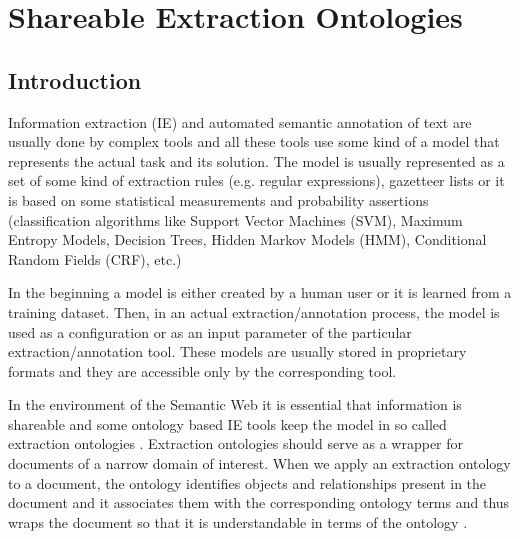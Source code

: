 \chapter{Shareable Extraction Ontologies} \label{ch:Shareable_Extraction_Ontologies}

\graphicspath{{../img/ch70/}}



\section{Introduction}


Information extraction (IE) and automated semantic annotation of text are usually done by complex tools and all these tools use some kind of a model that represents the actual task and its solution. The model is usually represented as a set of some kind of extraction rules (e.g. regular expressions), gazetteer lists or it is based on some statistical measurements and probability assertions (classification algorithms like Support Vector Machines (SVM), Maximum Entropy Models, Decision Trees, Hidden Markov Models (HMM), Conditional Random Fields (CRF), etc.)

In the beginning a model is either created by a human user or it is learned from a training dataset. Then, in an actual extraction/annotation process, the model is used as a configuration or as an input parameter of the particular extraction/annotation tool. These models are usually stored in proprietary formats and they are accessible only by the corresponding tool.

In the environment of the Semantic Web it is essential that information is shareable and some ontology based IE tools keep the model in so called extraction ontologies \citep{DBLP:conf/er/EmbleyTL02}. Extraction ontologies should serve as a wrapper for documents of a narrow domain of interest. When we apply an extraction ontology to a document, the ontology identifies objects and relationships present in the document and it associates them with the corresponding ontology terms and thus wraps the document so that it is understandable in terms of the ontology \citep{DBLP:conf/er/EmbleyTL02}.



